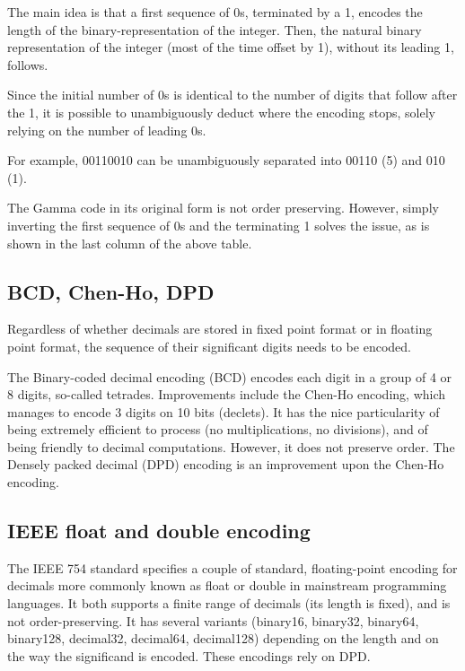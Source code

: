 \documentclass[final,leqno,onefignum,onetabnum]{siamltex1213}
\begin{document}
 The main idea is that a first sequence of 0s, terminated by a 1, encodes the length of the binary-representation of the integer. Then, the natural binary representation of the integer (most of the time offset by 1), without its leading 1, follows.

Since the initial number of 0s is identical to the number of digits that follow after the 1, it is possible to unambiguously deduct where the encoding stops, solely relying on the number of leading 0s.

For example, 00110010 can be unambiguously separated into 00110 (5) and 010 (1).

The Gamma code in its original form is not order preserving. However, simply inverting the first sequence of 0s and the terminating 1 solves the issue, as is shown in the last column of the above table.

\subsection{BCD, Chen-Ho, DPD}

Regardless of whether decimals are stored in fixed point format or in floating point format, the sequence of their significant digits needs to be encoded.

The Binary-coded decimal encoding (BCD) encodes each digit in a group of 4 or 8 digits, so-called tetrades. Improvements include the Chen-Ho \cite{ChenHo} encoding, which manages to encode 3 digits on 10 bits (declets). It has the nice particularity of being extremely efficient to process (no multiplications, no divisions), and of being friendly to decimal computations. However, it does not preserve order. The Densely packed decimal (DPD) encoding \cite{DPD} is an improvement upon the Chen-Ho encoding.

\subsection{IEEE float and double encoding}

The IEEE 754 standard specifies a couple of standard, floating-point encoding for decimals more commonly known as float or double in mainstream programming languages. It both supports a finite range of decimals (its length is fixed), and is not order-preserving. It has several variants (binary16, binary32, binary64, binary128, decimal32, decimal64, decimal128) depending on the length and on the way the significand is encoded. These encodings rely on DPD.
\end{document}
